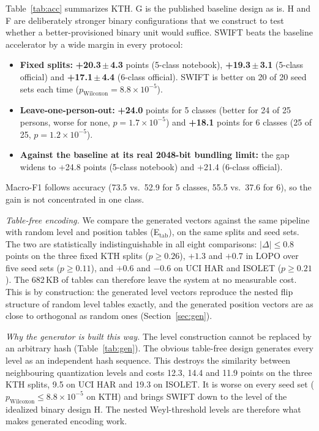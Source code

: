 \documentclass[conference]{IEEEtran}
\begin{document}
Table~\ref{tab:acc} summarizes KTH. G is the published baseline design as is. H and F are deliberately stronger binary configurations that we construct to test whether a better-provisioned binary unit would suffice. SWIFT beats the baseline accelerator by a wide margin in every protocol:
\begin{itemize}
\item \textbf{Fixed splits:} \textbf{+20.3\,$\pm$\,4.3} points (5-class notebook), \textbf{+19.3\,$\pm$\,3.1} (5-class official) and \textbf{+17.1\,$\pm$\,4.4} (6-class official). SWIFT is better on 20 of 20 seed sets each time ($p_{\mathrm{Wilcoxon}}=8.8\times10^{-5}$).
\item \textbf{Leave-one-person-out:} \textbf{+24.0} points for 5 classes (better for 24 of 25 persons, worse for none, $p=1.7\times10^{-5}$) and \textbf{+18.1} points for 6 classes (25 of 25, $p=1.2\times10^{-5}$).
\item \textbf{Against the baseline at its real 2048-bit bundling limit:} the gap widens to +24.8 points (5-class notebook) and +21.4 (6-class official).
\end{itemize}
Macro-F1 follows accuracy (73.5 vs.\ 52.9 for 5 classes, 55.5 vs.\ 37.6 for 6), so the gain is not concentrated in one class.

\emph{Table-free encoding.} We compare the generated vectors against the same pipeline with random level and position tables (E$_{\mathrm{tab}}$), on the same splits and seed sets. The two are statistically indistinguishable in all eight comparisons: $|\Delta|\le0.8$ points on the three fixed KTH splits ($p\ge0.26$), $+1.3$ and $+0.7$ in LOPO over five seed sets ($p\ge0.11$), and $+0.6$ and $-0.6$ on UCI HAR and ISOLET ($p\ge0.21$).
The 682\,KB of tables can therefore leave the system at no measurable cost. This is by construction: the generated level vectors reproduce the nested flip structure of random level tables exactly, and the generated position vectors are as close to orthogonal as random ones (Section~\ref{sec:gen}).

\emph{Why the generator is built this way.} The level construction cannot be replaced by an arbitrary hash (Table~\ref{tab:gen}). The obvious table-free design generates every level as an independent hash sequence. This destroys the similarity between neighbouring quantization levels and costs 12.3, 14.4 and 11.9 points on the three KTH splits, 9.5 on UCI HAR and 19.3 on ISOLET. It is worse on every seed set ($p_{\mathrm{Wilcoxon}}\le8.8\times10^{-5}$ on KTH) and brings SWIFT down to the level of the idealized binary design H. The nested Weyl-threshold levels are therefore what makes generated encoding work.
\end{document}

